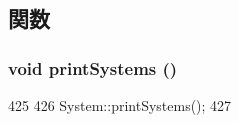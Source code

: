 \subsection{関数}
\hypertarget{sim_2system_8hh_a55206d1ab112cc51ccc3bbefdcc5b923}{
\subsubsection[{printSystems}]{\setlength{\rightskip}{0pt plus 5cm}void printSystems ()}}
\label{sim_2system_8hh_a55206d1ab112cc51ccc3bbefdcc5b923}



\begin{DoxyCode}
425 {
426     System::printSystems();
427 }
\end{DoxyCode}
